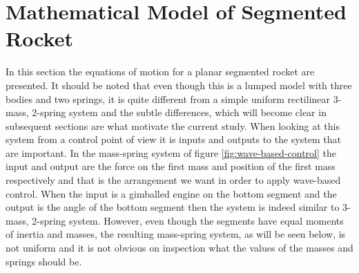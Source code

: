 \documentclass{mbd_fullpaper}
\begin{document}
\section{Mathematical Model of Segmented Rocket}
\label{sec:math-model}
In this section the equations of motion for a planar segmented rocket are presented.
It should be noted that even though this is a lumped model with three bodies and two springs, it is quite different from a simple uniform rectilinear 3-mass, 2-spring system and the subtle differences, which will become clear in subsequent sections are what motivate the current study.
When looking at this system from a control point of view it is inputs and outputs to the system that are important.
In the mass-spring system of figure \ref{fig:wave-based-control} the input and output are the force on the first mass and position of the first mass respectively and that is the arrangement we want in order to apply wave-based control.
When the input is a gimballed engine on the bottom segment and the output is the angle of the bottom segment then the system is indeed similar to 3-mass, 2-spring system.
However, even though the segments have equal moments of inertia and masses, the resulting mass-spring system, as will be seen below, is not uniform and it is not obvious on inspection what the values of the masses and springs should be.
\end{document}
